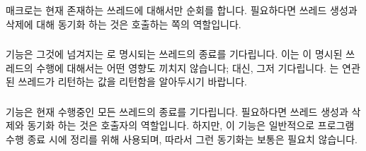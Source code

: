 \subsubsection{}

 매크로는 현재 존재하는 쓰레드에 대해서만
순회를 합니다.
필요하다면 쓰레드 생성과 삭제에 대해 동기화 하는 것은 호출하는 쪽의 역할입니다.

\subsubsection{}

 기능은 그것에 넘겨지는  로 명시되는
쓰레드의 종료를 기다립니다.
이는 이 명시된 쓰레드의 수행에 대해서는 어떤 영향도 끼치지 않습니다;
대신, 그저 기다립니다.
 는 연관된 쓰레드가 리턴하는 값을 리턴함을 알아두시기
바랍니다.

\subsubsection{}

 기능은 현재 수행중인 모든 쓰레드의 종료를
기다립니다.
필요하다면 쓰레드 생성과 삭제와 동기화 하는 것은 호출자의 역할입니다.
하지만, 이 기능은 일반적으로 프로그램 수행 종료 시에 정리를 위해 사용되며,
따라서 그런 동기화는 보통은 필요치 않습니다.

